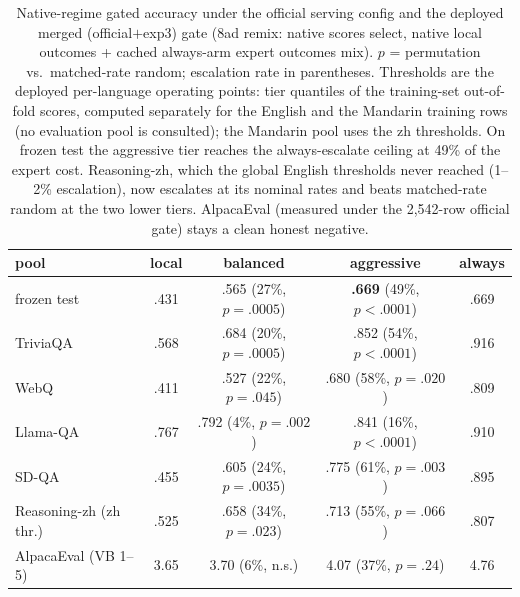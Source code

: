 \begin{table}[t]
\centering\small
\caption{Native-regime gated accuracy under the official serving
config and the deployed merged (official$+$exp3) gate (8ad remix:
native scores select, native local outcomes + cached always-arm
expert outcomes mix). $p$ = permutation vs.\ matched-rate random;
escalation rate in parentheses. Thresholds are the deployed
per-language operating points: tier quantiles of the training-set
out-of-fold scores, computed separately for the English and the
Mandarin training rows (no evaluation pool is consulted); the
Mandarin pool uses the zh thresholds. On frozen test the aggressive
tier reaches the always-escalate ceiling at 49\% of the expert cost.
Reasoning-zh, which the global English thresholds never reached
(1--2\% escalation), now escalates at its nominal rates and beats matched-rate
random at the two lower tiers. AlpacaEval (measured under the
2{,}542-row official gate) stays a clean honest negative.}
\label{tab:native-validity}
\begin{tabular}{lcccc}
\toprule
pool & local & balanced & aggressive & always \\
\midrule
frozen test & .431 & .565 (27\%, $p{=}.0005$) & \textbf{.669} (49\%, $p{<}.0001$) & .669 \\
TriviaQA & .568 & .684 (20\%, $p{=}.0005$) & .852 (54\%, $p{<}.0001$) & .916 \\
WebQ & .411 & .527 (22\%, $p{=}.045$) & .680 (58\%, $p{=}.020$) & .809 \\
Llama-QA & .767 & .792 (4\%, $p{=}.002$) & .841 (16\%, $p{<}.0001$) & .910 \\
SD-QA & .455 & .605 (24\%, $p{=}.0035$) & .775 (61\%, $p{=}.003$) & .895 \\
Reasoning-zh (zh thr.) & .525 & .658 (34\%, $p{=}.023$) & .713 (55\%, $p{=}.066$) & .807 \\
AlpacaEval (VB 1--5) & 3.65 & 3.70 (6\%, n.s.) & 4.07 (37\%, $p{=}.24$) & 4.76 \\
\bottomrule
\end{tabular}
\end{table}

